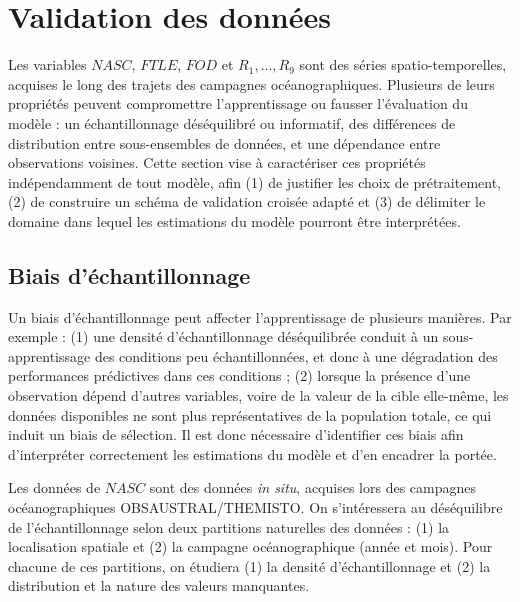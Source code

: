 \section{Validation des données} %
\label{section:validation_donnee}
Les variables $NASC$, $FTLE$, $FOD$ et $R_1, \ldots, R_9$ sont des séries spatio-temporelles, acquises le long des trajets des campagnes océanographiques. Plusieurs de leurs propriétés peuvent compromettre l'apprentissage ou fausser l'évaluation du modèle : un échantillonnage déséquilibré ou informatif, des différences de distribution entre sous-ensembles de données, et une dépendance entre observations voisines. Cette section vise à caractériser ces propriétés indépendamment de tout modèle, afin (1) de justifier les choix de prétraitement, (2) de construire un schéma de validation croisée adapté et (3) de délimiter le domaine dans lequel les estimations du modèle pourront être interprétées.

\subsection{Biais d'échantillonnage}
\label{subsection:biais_echantillonage}
Un biais d'échantillonnage peut affecter l'apprentissage de plusieurs manières. Par exemple : (1) une densité d'échantillonnage déséquilibrée conduit à un sous-apprentissage des conditions peu échantillonnées, et donc à une dégradation des performances prédictives dans ces conditions ; (2) lorsque la présence d'une observation dépend d'autres variables, voire de la valeur de la cible elle-même, les données disponibles ne sont plus représentatives de la population totale, ce qui induit un biais de sélection. Il est donc nécessaire d'identifier ces biais afin d'interpréter correctement les estimations du modèle et d'en encadrer la portée.

Les données de $NASC$ sont des données \textit{in situ}, acquises lors des campagnes océanographiques OBSAUSTRAL/THEMISTO. %
On s'intéressera au déséquilibre de l'échantillonnage selon deux partitions naturelles des données : (1) la localisation spatiale et (2) la campagne océanographique (année et mois). Pour chacune de ces partitions, on étudiera (1) la densité d'échantillonnage et (2) la distribution et la nature des valeurs manquantes.

